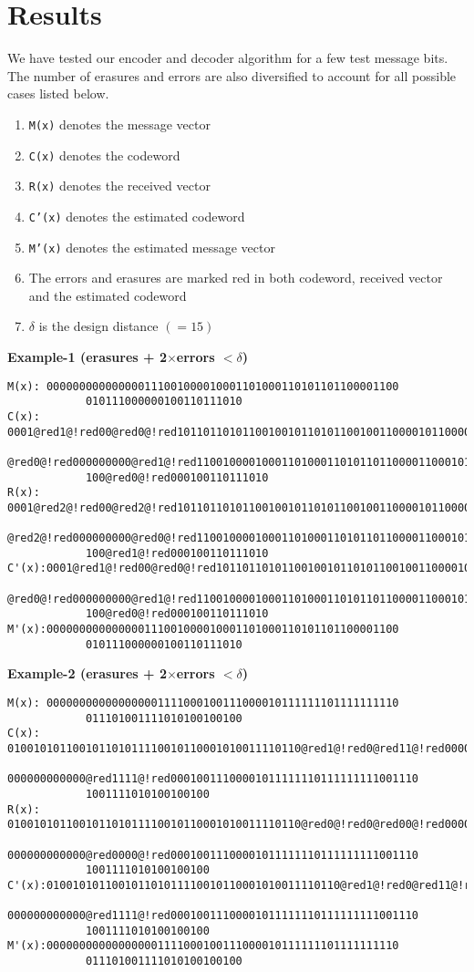 \documentclass[a4paper]{article}
\begin{document}
\section{Results}
We have tested our encoder and decoder algorithm for a few test message bits. The number of erasures and errors are also diversified to account for all possible cases listed below. 
\renewcommand{\labelenumi}{$\bullet$}
\begin{enumerate}
	\item \texttt{M(x)} denotes the message vector
    \item \texttt{C(x)} denotes the codeword
    \item \texttt{R(x)} denotes the received vector
    \item \texttt{C'(x)} denotes the estimated codeword
    \item \texttt{M'(x)} denotes the estimated message vector
    \item The errors and erasures are marked red in both codeword, received vector and the estimated codeword
    \item $\delta$ is the design distance $( = 15)$
\end{enumerate}
\textbf{Example-1 (erasures + 2$\times$errors $< \delta$)}
\begin{lstlisting}
M(x): 000000000000000111001000010001101000110101101100001100
			010111000000100110111010
C(x): 0001@red1@!red00@red0@!red1011011010110010010110101100100110000101100000
			@red0@!red000000000@red1@!red1100100001000110100011010110110000110001011
			100@red0@!red000100110111010
R(x): 0001@red2@!red00@red2@!red1011011010110010010110101100100110000101100000
			@red2@!red000000000@red0@!red1100100001000110100011010110110000110001011
			100@red1@!red000100110111010
C'(x):0001@red1@!red00@red0@!red1011011010110010010110101100100110000101100000
			@red0@!red000000000@red1@!red1100100001000110100011010110110000110001011
			100@red0@!red000100110111010
M'(x):000000000000000111001000010001101000110101101100001100
			010111000000100110111010

\end{lstlisting}
\textbf{Example-2 (erasures + 2$\times$errors $< \delta$)}
\begin{lstlisting}
M(x): 000000000000000001111000100111000010111111101111111110
			011101001111010100100100
C(x): 010010101100101101011110010110001010011110110@red1@!red0@red11@!red00000
			000000000000@red1111@!red00010011100001011111110111111111001110
			1001111010100100100
R(x): 010010101100101101011110010110001010011110110@red0@!red0@red00@!red00000
			000000000000@red0000@!red00010011100001011111110111111111001110
			1001111010100100100
C'(x):010010101100101101011110010110001010011110110@red1@!red0@red11@!red00000
			000000000000@red1111@!red00010011100001011111110111111111001110
			1001111010100100100
M'(x):000000000000000001111000100111000010111111101111111110
			011101001111010100100100
\end{lstlisting}
\end{document}

